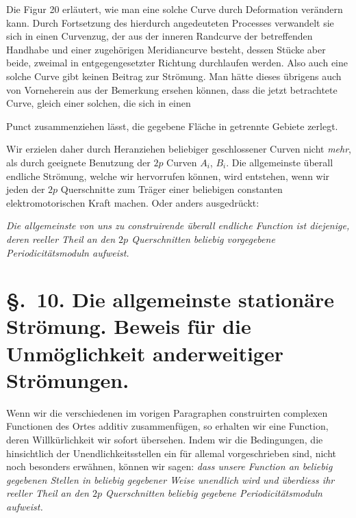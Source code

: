 \documentclass{article}
\begin{document}

Die Figur 20 erläutert, wie man eine solche Curve durch Deformation verändern kann. Durch Fortsetzung des hierdurch angedeuteten Processes verwandelt sie sich in einen Curvenzug, der aus der inneren Randcurve der betreffenden Handhabe und einer zugehörigen Meridiancurve besteht, dessen Stücke aber beide, zweimal in entgegengesetzter Richtung durchlaufen werden. Also auch eine solche Curve gibt keinen Beitrag zur Strömung. Man hätte dieses übrigens auch von Vorneherein aus der Bemerkung ersehen können, dass die jetzt betrachtete Curve, gleich einer solchen, die sich in einen

Punct zusammenziehen lässt, die gegebene Fläche in getrennte Gebiete zerlegt.

Wir erzielen daher durch Heranziehen beliebiger geschlossener Curven nicht \emph{mehr}, als durch geeignete Benutzung der $2p$ Curven $A_{i}$, $B_{i}$. Die allgemeinste überall endliche Strömung, welche wir hervorrufen können, wird entstehen, wenn wir jeden der $2p$ Querschnitte zum Träger einer beliebigen constanten elektromotorischen Kraft machen. Oder anders ausgedrückt:

\emph{Die allgemeinste von uns zu construirende überall endliche Function ist diejenige, deren reeller Theil an den $2p$ Querschnitten beliebig vorgegebene Periodicitätsmoduln aufweist.}

\section*{§.~10. Die allgemeinste stationäre Strömung. Beweis für die Unmöglichkeit anderweitiger Strömungen.}

Wenn wir die verschiedenen im vorigen Paragraphen construirten complexen Functionen des Ortes additiv zusammenfügen, so erhalten wir eine Function, deren Willkürlichkeit wir sofort übersehen. Indem wir die Bedingungen, die hinsichtlich der Unendlichkeitsstellen ein für allemal vorgeschrieben sind, nicht noch besonders erwähnen, können wir sagen: \emph{dass unsere Function an beliebig gegebenen Stellen in beliebig gegebener Weise unendlich wird und überdiess ihr reeller Theil an den $2p$ Querschnitten beliebig gegebene Periodicitätsmoduln aufweist.}
\end{document}
